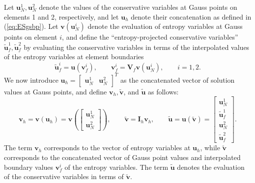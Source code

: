 \documentclass[review,onefignum,onetabnum,final]{siamart171218}
\renewcommand{\tilde}{\widetilde}
\newcommand{\LRp}[1]{\left( #1 \right)}
\begin{document}
Let $\bm{u}^1_N, \bm{u}^2_N$ denote the values of the conservative variables at Gauss points on elements 1 and 2, respectively, and let $\bm{u}_h$ denote their concatenation as defined in (\ref{eq:ESgsbp}).  Let $\bm{v}(\bm{u}^i_N)$ denote the evaluation of entropy variables at Gauss points on element $i$, and define the ``entropy-projected conservative variables'' $\tilde{\bm{u}}^1_f, \tilde{\bm{u}}^2_f$ by evaluating the conservative variables in terms of the  interpolated values of the entropy variables at element boundaries 
\[
\tilde{\bm{u}}^i_f = \bm{u}(\bm{v}^i_f), \qquad \bm{v}^i_f = \bm{V}_f\bm{v}(\bm{u}^i_N), \qquad i = 1,2. 
\]
We now introduce $\bm{u}_h = \begin{bmatrix}\bm{u}^1_N & \bm{u}^2_N\end{bmatrix}^T$ as the concatenated vector of solution values at Gauss points, and define $\bm{v}_h, \tilde{\bm{v}}$, and $\tilde{\bm{u}}$ as follows:  
\[
\bm{v}_h = \bm{v}\LRp{\bm{u}_h} = \bm{v}\LRp{\begin{bmatrix}
{\bm{u}^1_N}\\
{\bm{u}^2_N}
\end{bmatrix}}, \qquad \tilde{\bm{v}} = \bm{I}_h\bm{v}_h, \qquad \tilde{\bm{u}} = \bm{u}\LRp{\tilde{\bm{v}}} = 
\begin{bmatrix}
\bm{u}^1_N \\
\tilde{\bm{u}}^1_f \\
\bm{u}^2_N \\
\tilde{\bm{u}}^2_f
\end{bmatrix}.  
\]
The term $\bm{v}_h$ corresponds to the vector of entropy variables at $\bm{u}_h$, while $\tilde{\bm{v}}$ corresponds to the concatenated vector of Gauss point values and interpolated boundary values $\bm{v}^i_f$ of the entropy variables.  The term $\tilde{\bm{u}}$ denotes the evaluation of the conservative variables in terms of $\tilde{\bm{v}}$.  
\end{document}

